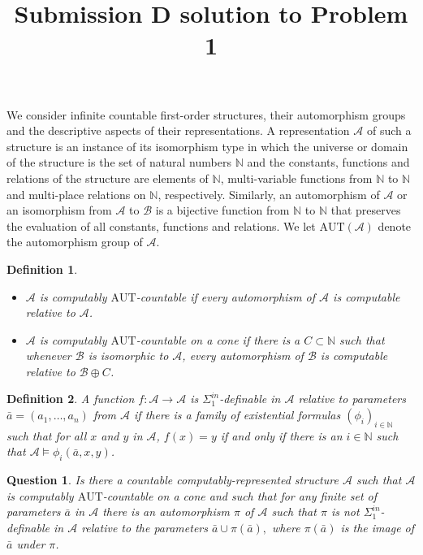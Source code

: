 \documentclass[12pt]{article}
\newcommand{\A}{\mathcal{A}}
\newcommand{\B}{\mathcal{B}}
\newcommand{\N}{\mathbb{N}}
\newcommand{\AUT}{\mathrm{AUT}}
\newtheorem{definition}{Definition}
\newtheorem{question}{Question}
\begin{document}
\title{Submission D solution to Problem 1}
\date{}
\maketitle

We consider infinite countable first-order structures, their automorphism groups and the descriptive aspects of their representations. A representation $\A$ of such a structure is an instance of its isomorphism type in which the universe or domain of the structure is the set of natural numbers $\N$ and the constants, functions and relations of the structure are elements of $\N$, multi-variable functions from $\N$ to $\N$ and multi-place relations on $\N$, respectively.   Similarly, an automorphism of $\A$ or an isomorphism from $\A$ to $\B$ is a bijective function from $\N$ to $\N$ that preserves the evaluation of all constants, functions and relations.  We let $\AUT(\A)$ denote the automorphism group of $\A$.

\begin{definition}\label{1.1}
  \begin{itemize}
  \item     $\A$ is \emph{computably $\AUT$-countable} if every automorphism of $\A$ is computable relative to $\A$.  
  \item  $\A$ is \emph{computably $\AUT$-countable on a cone} if there is a $C\subset\N$ such that whenever $\B$ is isomorphic to $\A$, every automorphism of $\B$ is computable relative to $\B\oplus C$.
  \end{itemize}
\end{definition}


\begin{definition}
  A function $f:\A\to\A$ is \emph{$\Sigma^{in}_1$-definable} in $\A$ relative to parameters
  $\bar{a}=(a_1,\dots,a_n)$ from $\A$ if there is a family of existential formulas $(\phi_i)_{i\in\N}$ such that for all $x$ and $y$ in $\A$, $f(x)=y$ if and only if there is an $i\in\N$ such that $\A\models\phi_i(\bar{a},x,y)$.
\end{definition}

\begin{question}\label{sec:question}\label{1.2}
  Is there a countable computably-represented structure $\A$ such that $\A$ is computably $\AUT$-countable on a cone and such that for any finite  set of parameters $\bar{a}$ in $\A$ there is an automorphism $\pi$ of $\A$ such that $\pi$ is not $\Sigma^{in}_1$-definable in $\A$ relative to the parameters $\bar{a}\cup \pi(\bar{a}),$ where $\pi(\bar{a})$ is the image of $\bar{a}$ under $\pi$.
\end{question}
\end{document}
